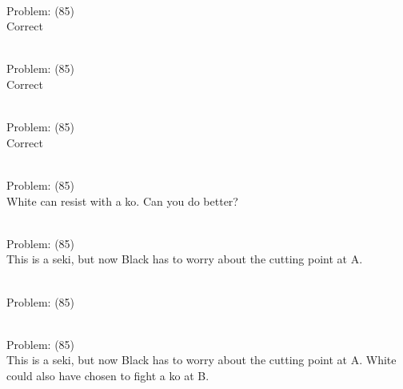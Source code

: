 \documentclass[11pt]{article}
\begin{document}
\begin{minipage}[t]{0.5\textwidth}
  {\centering
  
\\
Problem: (85)\\
Correct\\
  }
\end{minipage}
\begin{minipage}[t]{0.5\textwidth}
  {\centering
  
\\
Problem: (85)\\
Correct\\
  }
\end{minipage}
\begin{minipage}[t]{0.5\textwidth}
  {\centering
  
\\
Problem: (85)\\
Correct\\
  }
\end{minipage}
\begin{minipage}[t]{0.5\textwidth}
  {\centering
  
\\
Problem: (85)\\
White can resist with a ko. Can you do better?\\
  }
\end{minipage}
\begin{minipage}[t]{0.5\textwidth}
  {\centering
  
\\
Problem: (85)\\
This is a seki, but now Black has to worry about the cutting point at A.\\
  }
\end{minipage}
\begin{minipage}[t]{0.5\textwidth}
  {\centering
  
\\
Problem: (85)\\
  }
\end{minipage}
\begin{minipage}[t]{0.5\textwidth}
  {\centering
  
\\
Problem: (85)\\
This is a seki, but now Black has to worry about the cutting point at A. White could also have chosen to fight a ko at B.\\
  }
\end{minipage}
\end{document}

